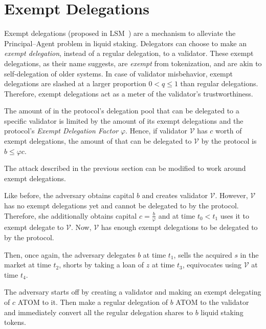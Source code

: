 \section{Exempt Delegations}

Exempt delegations (proposed in LSM~\cite{liquidity-staking-module})
are a mechanism to alleviate
the Principal--Agent problem in liquid staking.
Delegators can choose to make an \emph{exempt delegation},
instead of a regular delegation, to a validator.
These exempt delegations, as their name suggests,
are \emph{exempt} from tokenization,
and are akin to self-delegation of older systems.
In case of validator misbehavior, exempt delegations
are slashed at a larger proportion $0 < q \leq 1$ than regular delegations.
Therefore, exempt delegations act as a meter of the
validator's trustworthiness.


The amount of \asset in the protocol's delegation pool that can be
delegated to a specific validator is limited by the amount of its
exempt delegations and the protocol's \emph{Exempt Delegation Factor} $\varphi$.
Hence, if validator $\mathcal{V}$ has $c$ \asset worth of exempt delegations,
the amount of \asset that can be delegated to $\mathcal{V}$ by the protocol
is $b \leq \varphi c$.

The attack described in the previous section can be modified to work
around exempt delegations.

Like before, the adversary obtains capital $b$ \asset and creates
validator $\mathcal{V}$.
However, $\mathcal{V}$ has no exempt delegations yet and cannot be delegated to
by the protocol.
Therefore, she additionally obtains capital $c = \frac{b}{\varphi}$ \asset
and at time $t_0 < t_1$ uses it to exempt delegate to $\mathcal{V}$.
Now, $\mathcal{V}$ has enough exempt delegations to be delegated to by the protocol.

Then, once again, the adversary delegates $b$ \asset at time $t_1$,
sells the acquired $s$ \stasset in the market at time $t_2$, shorts \stasset by taking a loan
of $z$ \stasset at time $t_3$, equivocates using $\mathcal{V}$ at time $t_4$.


The adversary starts off by creating a validator and making an
exempt delegating of $c$ ATOM to it.
Then make a regular delegation of $b$ ATOM to the validator and
immediately convert all the regular delegation shares to $b$ liquid
staking tokens.


